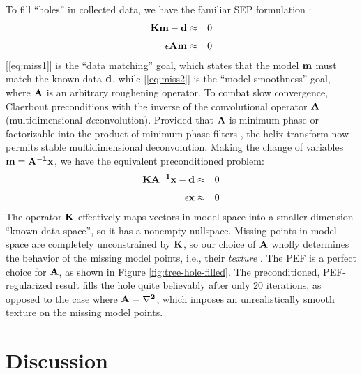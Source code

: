 	To fill ``holes'' in collected data, we have the familiar SEP formulation 
	{\small \cite{gee}}:
	\begin{eqnarray}
		\bf Km - d &\approx& 0 \label{eq:miss1} \\[0.05in]
		\bf \epsilon Am &\approx& 0 \label{eq:miss2}
	\end{eqnarray}
	[\ref{eq:miss1}] is the ``data matching'' goal, which states that the model $\bf m$
	must match the known data $\bf d$, while [\ref{eq:miss2}] is the ``model smoothness''
	goal, where $\bf A$ is an arbitrary roughening operator.  To combat slow convergence,
	Claerbout {\small {}} preconditions with the inverse of the convolutional 
	operator $\bf A$ (multidimensional {\em de}convolution).  Provided that
	$\bf A$ is minimum phase or factorizable into the product of minimum phase filters
	\cite{Sava.sep.97.paul1},
	the helix transform now permits stable multidimensional deconvolution.  Making
	the change of variables $\bf m = A^{-1}x$, we have the equivalent preconditioned problem:
	\begin{eqnarray}
		\bf KA^{-1}x - d &\approx& 0 \label{eq:prec1} \\[0.05in]
		\bf \epsilon x &\approx& 0 \label{eq:prec2}
	\end{eqnarray}
	The operator $\bf K$ effectively maps vectors in model space into 
	a smaller-dimension ``known data space'', so it has a nonempty nullspace.
	Missing points in model space are completely unconstrained by $\bf K$, so
	our choice of $\bf A$ wholly determines the behavior of the missing model points, i.e.,
	their {\em texture} {\small \cite{Fomel.sep.95.sergey1}}.  
	The PEF is a perfect choice for $\bf A$, as shown in Figure
	\ref{fig:tree-hole-filled}.  The preconditioned, PEF-regularized result fills the
	hole quite believably after only 20 iterations, as opposed to the case where
	$\bf A = \nabla^2$, which imposes an unrealistically smooth texture on the missing 
	model points.  


\section{ Discussion}

